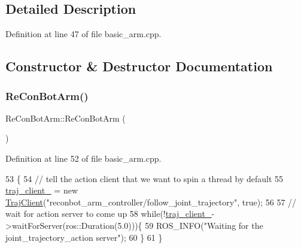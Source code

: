 \subsection{Detailed Description}


Definition at line 47 of file basic\+\_\+arm.\+cpp.



\subsection{Constructor \& Destructor Documentation}
\mbox{\label{class_re_con_bot_arm_acdc750bbe5edac6d78c117e0b2073c60}} 
\subsubsection{\texorpdfstring{Re\+Con\+Bot\+Arm()}{ReConBotArm()}}
{\footnotesize\ttfamily Re\+Con\+Bot\+Arm\+::\+Re\+Con\+Bot\+Arm (\begin{DoxyParamCaption}{ }\end{DoxyParamCaption})\hspace{0.3cm}{\ttfamily [inline]}}



Definition at line 52 of file basic\+\_\+arm.\+cpp.


\begin{DoxyCode}
53   \{
54     \textcolor{comment}{// tell the action client that we want to spin a thread by default}
55     \hyperlink{class_re_con_bot_arm_a0be83821f776c5ca9874fabbeaa177cf}{traj\_client\_} = \textcolor{keyword}{new} \hyperlink{basic__arm_8cpp_a6fb8875093261cdc69e54d3ac7d5c301}{TrajClient}(\textcolor{stringliteral}{"reconbot\_arm\_controller/follow\_joint\_trajectory"}, \textcolor{keyword}{
      true});
56 
57     \textcolor{comment}{// wait for action server to come up}
58     \textcolor{keywordflow}{while}(!\hyperlink{class_re_con_bot_arm_a0be83821f776c5ca9874fabbeaa177cf}{traj\_client\_}->waitForServer(ros::Duration(5.0)))\{
59     ROS\_INFO(\textcolor{stringliteral}{"Waiting for the joint\_trajectory\_action server"});
60     \}
61   \}
\end{DoxyCode}
\mbox{\label{class_re_con_bot_arm_ab8ce7d41fb625ac7ad8486278b5e2a45}} 
